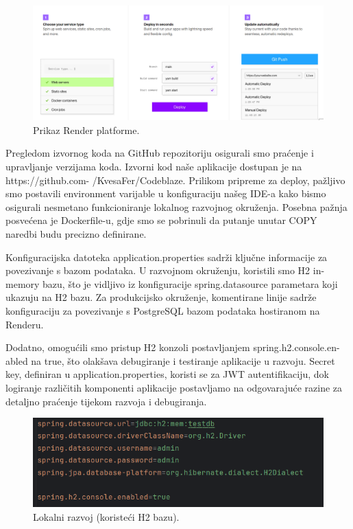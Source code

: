 		\begin{figure} [H]
			\centering
			\includegraphics[width=0.7\linewidth]{slike/render.png}
			\caption{Prikaz Render platforme.}
			\label{fig:Prikaz Render platforme.}
		\end{figure}

		Pregledom izvornog koda na GitHub repozitoriju osigurali smo praćenje i upravljanje verzijama koda. Izvorni kod naše aplikacije dostupan je na https://github.com- /KvesaFer/Codeblaze. Prilikom pripreme za deploy, pažljivo smo postavili environment varijable u konfiguraciju našeg IDE-a kako bismo osigurali nesmetano funkcioniranje lokalnog razvojnog okruženja. Posebna pažnja posvećena je Dockerfile-u, gdje smo se pobrinuli da putanje unutar COPY naredbi budu precizno definirane.

		Konfiguracijska datoteka application.properties sadrži ključne informacije za povezivanje s bazom podataka. U razvojnom okruženju, koristili smo H2 in-memory bazu, što je vidljivo iz konfiguracije spring.datasource parametara koji ukazuju na H2 bazu. Za produkcijsko okruženje, komentirane linije sadrže konfiguraciju za povezivanje s PostgreSQL bazom podataka hostiranom na Renderu.

		Dodatno, omogućili smo pristup H2 konzoli postavljanjem spring.h2.console.en- abled na true, što olakšava debugiranje i testiranje aplikacije u razvoju. Secret key, definiran u application.properties, koristi se za JWT autentifikaciju, dok logiranje različitih komponenti aplikacije postavljamo na odgovarajuće razine za detaljno praćenje tijekom razvoja i debugiranja.

		\begin{figure} [H]
			\centering
			\includegraphics[width=0.7\linewidth]{slike/ap.png}
			\caption{Lokalni razvoj (koristeći H2 bazu).}
			\label{fig:Lokalni razvoj (koristeći H2 bazu).}
		\end{figure}


